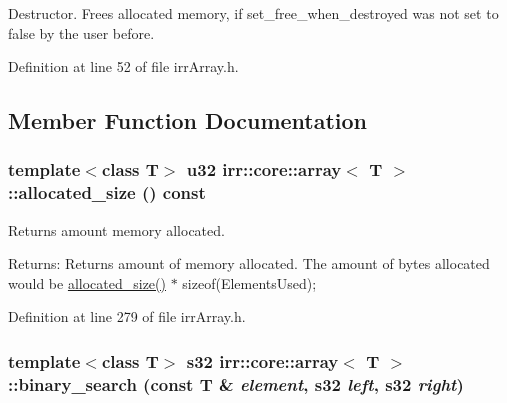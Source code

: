 Destructor. Frees allocated memory, if set\_\-free\_\-when\_\-destroyed was not set to false by the user before. 

Definition at line 52 of file irrArray.h.

\subsection{Member Function Documentation}
\hypertarget{classirr_1_1core_1_1array_3291d7ce05c97ce6acf794f53718df63}{
\subsubsection[{allocated\_\-size}]{\setlength{\rightskip}{0pt plus 5cm}template$<$class T$>$ {\bf u32} {\bf irr::core::array}$<$ T $>$::allocated\_\-size () const}}
\label{classirr_1_1core_1_1array_3291d7ce05c97ce6acf794f53718df63}


Returns amount memory allocated. \begin{Desc}
\item[Returns:]Returns amount of memory allocated. The amount of bytes allocated would be \hyperlink{classirr_1_1core_1_1array_3291d7ce05c97ce6acf794f53718df63}{allocated\_\-size()} $\ast$ sizeof(ElementsUsed); \end{Desc}


Definition at line 279 of file irrArray.h.\hypertarget{classirr_1_1core_1_1array_995506f4a479910947ebbf74a939aed4}{
\subsubsection[{binary\_\-search}]{\setlength{\rightskip}{0pt plus 5cm}template$<$class T$>$ {\bf s32} {\bf irr::core::array}$<$ T $>$::binary\_\-search (const T \& {\em element}, \/  {\bf s32} {\em left}, \/  {\bf s32} {\em right})}}
\label{classirr_1_1core_1_1array_995506f4a479910947ebbf74a939aed4}


